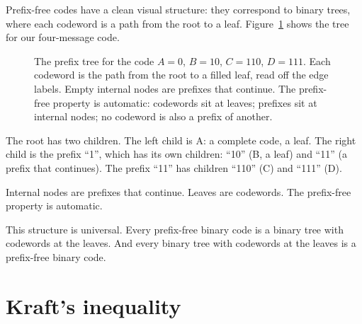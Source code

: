 Prefix-free codes have a clean visual structure: they correspond to binary trees, where each codeword is a path from the root to a leaf. Figure~\ref{fig:prefix-tree} shows the tree for our four-message code.

\begin{figure}[h]
\centering
{}
\caption{The prefix tree for the code $A=0$, $B=10$, $C=110$, $D=111$. Each codeword is the path from the root to a filled leaf, read off the edge labels. Empty internal nodes are prefixes that continue. The prefix-free property is automatic: codewords sit at leaves; prefixes sit at internal nodes; no codeword is also a prefix of another.}
\label{fig:prefix-tree}
\end{figure}

The root has two children. The left child is A: a complete code, a leaf. The right child is the prefix ``1'', which has its own children: ``10'' (B, a leaf) and ``11'' (a prefix that continues). The prefix ``11'' has children ``110'' (C) and ``111'' (D).

Internal nodes are prefixes that continue. Leaves are codewords. The prefix-free property is automatic.

This structure is universal. Every prefix-free binary code is a binary tree with codewords at the leaves. And every binary tree with codewords at the leaves is a prefix-free binary code.

\section*{Kraft's inequality}


